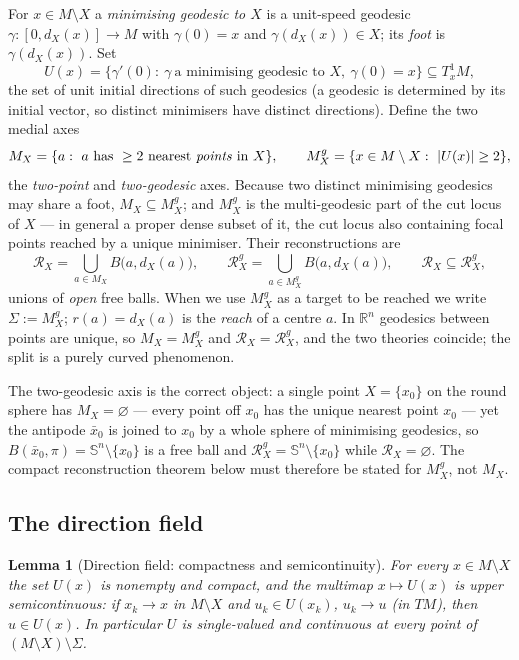 \documentclass[11pt]{article}
\newtheorem{lemma}[theorem]{Lemma}
\theoremstyle{remark}
\newcommand{\R}{\mathbb{R}}
\newcommand{\X}{X}
\newcommand{\Mx}{M_{\X}}
\newcommand{\Mg}{M^{g}_{\X}}
\newcommand{\Rx}{\mathcal{R}_{\X}}
\newcommand{\Rg}{\mathcal{R}^{g}_{\X}}
\newcommand{\dX}{d_{\X}}
\newcommand{\Sn}{\mathbb{S}^{n}}
\begin{document}
For $x\in M\setminus\X$ a \emph{minimising geodesic to $\X$} is a
unit-speed geodesic $\gamma:[0,\dX(x)]\to M$ with $\gamma(0)=x$ and
$\gamma(\dX(x))\in\X$; its \emph{foot} is $\gamma(\dX(x))$. Set
\[
  U(x)=\bigl\{\gamma'(0):\ \gamma\ \text{a minimising geodesic to
  }\X,\ \gamma(0)=x\bigr\}\subseteq T^{1}_{x}M,
\]
the set of unit initial directions of such geodesics (a geodesic is
determined by its initial vector, so distinct minimisers have
distinct directions). Define the two medial axes
\[
  \Mx=\{a:\ a\ \text{has}\ \ge2\ \text{nearest \emph{points} in}\
  \X\},\qquad
  \Mg=\{x\in M\setminus\X:\ |U(x)|\ge2\},
\]
the \emph{two-point} and \emph{two-geodesic} axes. Because two
distinct minimising geodesics may share a foot, $\Mx\subseteq\Mg$;
and $\Mg$ is the multi-geodesic part of the cut locus of $\X$ --- in
general a proper dense subset of it, the cut locus also containing
focal points reached by a unique minimiser. Their reconstructions
are
\[
  \Rx=\bigcup_{a\in\Mx}B\bigl(a,\dX(a)\bigr),\qquad
  \Rg=\bigcup_{a\in\Mg}B\bigl(a,\dX(a)\bigr),\qquad
  \Rx\subseteq\Rg,
\]
unions of \emph{open} free balls. When we use $\Mg$ as a target to
be reached we write $\Sigma:=\Mg$; $r(a)=\dX(a)$ is the \emph{reach}
of a centre $a$. In $\R^{n}$ geodesics between points are unique, so
$\Mx=\Mg$ and $\Rx=\Rg$, and the two theories coincide; the split is
a purely curved phenomenon.

The two-geodesic axis is the correct object: a single point
$\X=\{x_{0}\}$ on the round sphere has $\Mx=\varnothing$ --- every
point off $x_{0}$ has the unique nearest point $x_{0}$ --- yet the
antipode $\bar x_{0}$ is joined to $x_{0}$ by a whole sphere of
minimising geodesics, so $B(\bar x_{0},\pi)=\Sn\setminus\{x_{0}\}$ is
a free ball and $\Rg=\Sn\setminus\{x_{0}\}$ while $\Rx=\varnothing$.
The compact reconstruction theorem below must therefore be stated for
$\Mg$, not $\Mx$.


\subsection{The direction field}

\begin{lemma}[Direction field: compactness and semicontinuity]
\label{lem:usc}
For every $x\in M\setminus\X$ the set $U(x)$ is nonempty and compact,
and the multimap $x\mapsto U(x)$ is upper semicontinuous: if
$x_{k}\to x$ in $M\setminus\X$ and $u_{k}\in U(x_{k})$, $u_{k}\to u$
(in $TM$), then $u\in U(x)$. In particular $U$ is single-valued and
continuous at every point of $(M\setminus\X)\setminus\Sigma$.
\end{lemma}
\end{document}
